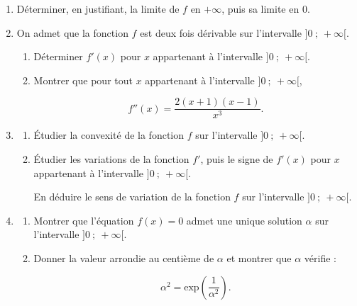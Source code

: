 \begin{enumerate}
\item Déterminer, en justifiant, la limite de $f$ en $+\infty$, puis sa limite en $0$.
\item On admet que la fonction $f$ est deux fois dérivable sur l'intervalle $]0~;~+\infty[$.
	\begin{enumerate}
		\item Déterminer $f'(x)$ pour $x$ appartenant à l'intervalle $]0~;~+\infty[$.
		\item Montrer que pour tout $x$ appartenant à l'intervalle $]0~;~+\infty[$,

\[f''(x) = \dfrac{2(x + 1)(x - 1)}{x^3}.\]
	\end{enumerate}
\item 
	\begin{enumerate}
		\item Étudier la convexité de la fonction $f$ sur l'intervalle $]0~;~+\infty[$.
		\item Étudier les variations de la fonction $f'$, puis le signe de $f'(x)$ pour $x$ appartenant à l'intervalle $]0~;~+\infty[$.
		
En déduire le sens de variation de la fonction $f$ sur l'intervalle $]0~;~+\infty[$.
	\end{enumerate}
\item
	\begin{enumerate}
		\item Montrer que l'équation $f(x) = 0$ admet une unique solution $\alpha$ sur l'intervalle $]0~;~+\infty[$.
		\item Donner la valeur arrondie au centième de $\alpha$ et montrer que $\alpha$ vérifie :
		
\[\alpha^2 = \text{exp} \left(\dfrac{1}{\alpha^2}\right).\]
	\end{enumerate}
\end{enumerate}

\bigskip
